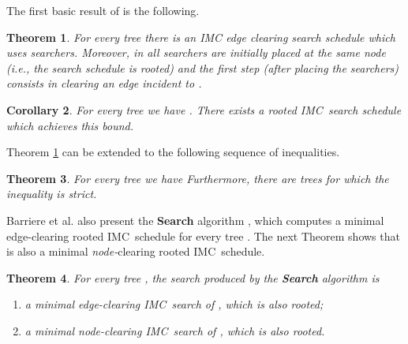 \documentclass[11pt]{article}\usepackage{amsmath}
\newtheorem{theorem}{Theorem}[section]
\newtheorem{corollary}[theorem]{Corollary}
\begin{document}
The first basic result of \cite{Barriere1} is the following.

\begin{theorem}
\label{prp0404}\cite{Barriere1} For every tree  there is an IMC
edge clearing search schedule  which uses  searchers. Moreover, in  all searchers are
initially placed at the same node  (i.e., the search schedule is
rooted) and the first step (after placing the searchers) consists in clearing
an edge incident to .
\end{theorem}

\begin{corollary}
\label{prp0405}For every tree  we have . There exists a
\emph{rooted }IMC\ search schedule which achieves this bound.
\end{corollary}

Theorem \ref{prp0404} can be extended to the following sequence of
inequalities\cite{Barriere2}.

\begin{theorem}
\label{prp0406}\cite{Barriere2} For every tree  we have
Furthermore, there are trees  for which the inequality  is strict.
\end{theorem}

Barriere et al. also present the \textbf{Search }algorithm \cite{Barriere1},
which computes a minimal edge-clearing rooted IMC\ schedule  for
every tree . The next Theorem shows that  is also a
minimal \emph{node-}clearing rooted IMC\ schedule.

\begin{theorem}
\label{prp0413}For every tree , the search  produced
by the \textbf{Search} algorithm is

\begin{enumerate}
\item a minimal edge-clearing IMC\ search of , which is also rooted;

\item a minimal node-clearing IMC\ search of , which is also rooted.
\end{enumerate}
\end{theorem}
\end{document}

